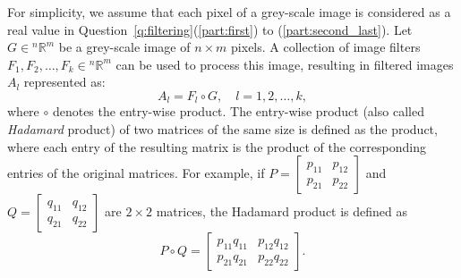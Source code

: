 \documentclass[10pt,addpoints]{exam} %
\newcommand{\matrixTwo}[4]{\left[\begin{array}{cc}#1&#2\\#3&#4\end{array}\right]}
\newcommand{\nRm}{{}^{n}\mathbb{R}^{m}}
\begin{document}
\begin{questions}
  \question\label{q:filtering} For simplicity, we assume that each
    pixel of a grey-scale image is considered as a real value in
    Question~\ref{q:filtering}(\ref{part:first}) to (\ref{part:second_last}).
  Let $G \in \nRm$ be a grey-scale image of $n \times m$ pixels. A collection of
  image filters $ F_1, F_2, \dots, F_k \in \nRm$ can be used to process this
  image, resulting in filtered images $A_l$ represented as:
  \begin{equation}
    \label{eq:filter}
    A_l = F_l \circ G, \quad l = 1, 2, \dots, k,
  \end{equation}
  where $ \circ $ denotes the entry-wise product. The entry-wise product (also called
  \textit{Hadamard} product) of two matrices of the same size is defined as the product, where each
  entry of the resulting matrix is the product of the corresponding entries of the original
  matrices.
  For example, if $P = \matrixTwo{p_{11}}{p_{12}}{p_{21}}{p_{22}}$ and
  $Q= \matrixTwo{q_{11}}{q_{12}}{q_{21}}{q_{22}}$ are $2\times 2$ matrices, the Hadamard product is
  defined as
  \begin{equation}
  P\circ Q = \matrixTwo{p_{11}q_{11}}{p_{12}q_{12}}{p_{21}q_{21}}{p_{22}q_{22}}.
\end{equation}
        
\end{questions}
\end{document}
